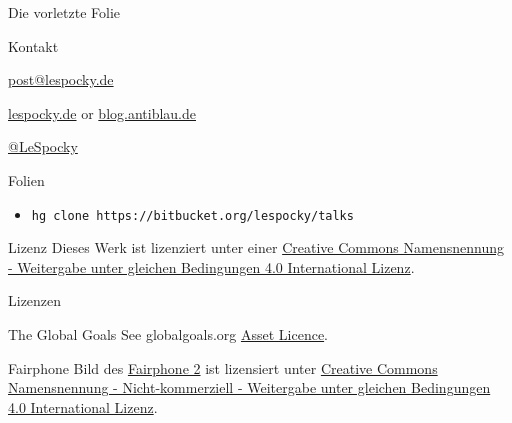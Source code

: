 \documentclass[t]{beamer}
\begin{document}
\begin{frame}{Die vorletzte Folie}
    \begin{block}{Kontakt}
        \begin{description}[Twitter]
            \item [E-Mail] \href{mailto:post@lespocky.de}{post@lespocky.de}
            \item [WWW] \href{http://www.lespocky.de/}{lespocky.de} or
                    \href{http://blog.antiblau.de/}{blog.antiblau.de}
            \item [Twitter] \href{https://twitter.com/LeSpocky}{@LeSpocky}
        \end{description}
    \end{block}
    \begin{block}{Folien}
        \begin{itemize}
            \item \texttt{hg clone https://bitbucket.org/lespocky/talks}
        \end{itemize}
    \end{block}
    \begin{block}{Lizenz}
        Dieses Werk ist lizenziert unter einer
        \href{http://creativecommons.org/licenses/by-sa/4.0/}{Creative Commons
        Namensnennung - Weitergabe unter gleichen Bedingungen 4.0 International
        Lizenz}.
    \end{block}
\end{frame}

\begin{frame}{Lizenzen}
    \begin{block}{The Global Goals}
        See globalgoals.org
        \href{https://www.globalgoals.org/asset-licence}{Asset Licence}.
    \end{block}
    \begin{block}{Fairphone}
        Bild des \href{https://shop.fairphone.com/de/}{Fairphone 2} ist
        lizensiert unter
        \href{https://creativecommons.org/licenses/by-nc-sa/4.0/}{Creative
        Commons Namensnennung - Nicht-kommerziell - Weitergabe unter
        gleichen Bedingungen 4.0 International Lizenz}.
    \end{block}
\end{frame}
\end{document}
